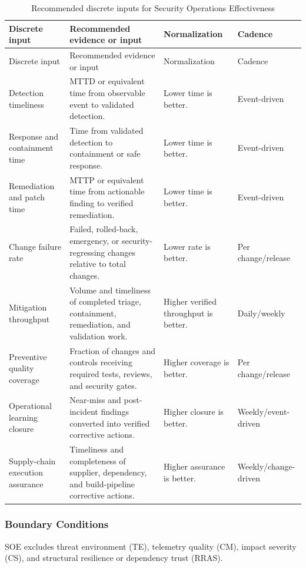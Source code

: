 \documentclass[11pt]{article}
\begin{document}
\begin{longtable}{P{0.18\textwidth} P{0.35\textwidth} P{0.18\textwidth} P{0.17\textwidth}}
  \caption{Recommended discrete inputs for Security Operations Effectiveness}\\
  \toprule
  Discrete input & Recommended evidence or input & Normalization & Cadence \\
  \midrule
  \endfirsthead
  \toprule
  Discrete input & Recommended evidence or input & Normalization & Cadence \\
  \midrule
  \endhead
  Detection timeliness & MTTD or equivalent time from observable event to validated detection. & Lower time is better. & Event-driven \\
  Response and containment time & Time from validated detection to containment or safe response. & Lower time is better. & Event-driven \\
  Remediation and patch time & MTTP or equivalent time from actionable finding to verified remediation. & Lower time is better. & Event-driven \\
  Change failure rate & Failed, rolled-back, emergency, or security-regressing changes relative to total changes. & Lower rate is better. & Per change/release \\
  Mitigation throughput & Volume and timeliness of completed triage, containment, remediation, and validation work. & Higher verified throughput is better. & Daily/weekly \\
  Preventive quality coverage & Fraction of changes and controls receiving required tests, reviews, and security gates. & Higher coverage is better. & Per change/release \\
  Operational learning closure & Near-miss and post-incident findings converted into verified corrective actions. & Higher closure is better. & Weekly/event-driven \\
  Supply-chain execution assurance & Timeliness and completeness of supplier, dependency, and build-pipeline corrective actions. & Higher assurance is better. & Weekly/change-driven \\
  \bottomrule
\end{longtable}

\subsubsection{Boundary Conditions}
SOE excludes threat environment (TE), telemetry quality (CM), impact severity (CS),
and structural resilience or dependency trust (RRAS).
\end{document}
